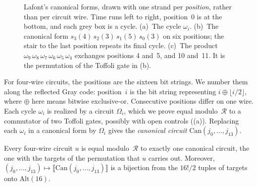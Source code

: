 \documentclass[acmsmall,screen,nonacm]{acmart}
\begin{document}
\begin{figure}[!htbp]
\centering
\small
{}
\caption{Lafont's canonical forms, drawn with one strand per
\emph{position}, rather than per circuit wire. Time runs left to right,
position~0 is at the bottom, and each grey box is a cycle.
(a)~The cycle $\omega_i$.
(b)~The canonical form $s_3(4)\,s_2(3)\,s_1(5)\,s_0(3)$ on six positions;
the stair to the last position repeats its final cycle.
(c)~The product $\omega_9\,\omega_8\,\omega_7\,\omega_6\,\omega_5\,\omega_4$
exchanges positions 4 and~5, and 10 and~11. It is the permutation
of the Toffoli gate in (b).}
\label{fig:xcxccx-lafont}
\end{figure}

For four-wire circuits, the positions are the sixteen bit strings.
We number them along the reflected Gray code: position~$i$ is the
bit string representing $i\oplus\lfloor i/2\rfloor$, where $\oplus$
here means bitwise exclusive-or. Consecutive positions differ on
one wire. Each cycle $\omega_i$ is realized by a circuit $\Omega_i$,
which we prove equal modulo~$\mathcal{R}$ to a commutator of two
Toffoli gates, possibly with open controls
((a)).
Replacing each $\omega_i$ in a canonical form by $\Omega_i$ gives
the \emph{canonical circuit} $\mathrm{Can}(j_0,\dots,j_{13})$.

\begin{theorem}\label{thm:xcxccx-nf}
Every four-wire circuit $u$ is equal modulo~$\mathcal{R}$ to exactly one canonical circuit, the one with the targets of the permutation that $u$ carries out. Moreover, $(j_0,\dots,j_{13})\mapsto\llbracket\mathrm{Can}(j_0,\dots,j_{13})\rrbracket$ is a bijection from the $16!/2$ tuples of targets onto $\mathrm{Alt}(16)$.
\end{theorem}
\end{document}
